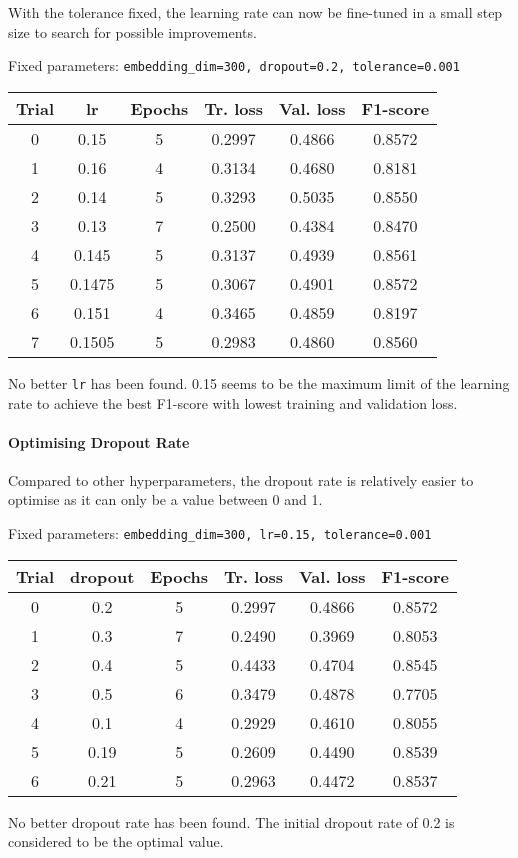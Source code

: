 \documentclass[11pt]{article}
\begin{document}
With the tolerance fixed, the learning rate can now be fine-tuned in a
small step size to search for possible improvements.

Fixed parameters:
\texttt{embedding\_dim=300,\ dropout=0.2,\ tolerance=0.001}

\begin{longtable}[]{@{}cccccc@{}}
\toprule
Trial & lr & Epochs & Tr. loss & Val. loss & F1-score\tabularnewline
\midrule
\endhead
0 & 0.15 & 5 & 0.2997 & 0.4866 & 0.8572\tabularnewline
1 & 0.16 & 4 & 0.3134 & 0.4680 & 0.8181\tabularnewline
2 & 0.14 & 5 & 0.3293 & 0.5035 & 0.8550\tabularnewline
3 & 0.13 & 7 & 0.2500 & 0.4384 & 0.8470\tabularnewline
4 & 0.145 & 5 & 0.3137 & 0.4939 & 0.8561\tabularnewline
5 & 0.1475 & 5 & 0.3067 & 0.4901 & 0.8572\tabularnewline
6 & 0.151 & 4 & 0.3465 & 0.4859 & 0.8197\tabularnewline
7 & 0.1505 & 5 & 0.2983 & 0.4860 & 0.8560\tabularnewline
\bottomrule
\end{longtable}

No better \texttt{lr} has been found. 0.15 seems to be the maximum limit
of the learning rate to achieve the best F1-score with lowest training
and validation loss.

\hypertarget{optimising-dropout-rate}{%
\paragraph{Optimising Dropout Rate}\label{optimising-dropout-rate}}

Compared to other hyperparameters, the dropout rate is relatively easier
to optimise as it can only be a value between 0 and 1.

Fixed parameters:
\texttt{embedding\_dim=300,\ lr=0.15,\ tolerance=0.001}

\begin{longtable}[]{@{}cccccc@{}}
\toprule
Trial & dropout & Epochs & Tr. loss & Val. loss &
F1-score\tabularnewline
\midrule
\endhead
0 & 0.2 & 5 & 0.2997 & 0.4866 & 0.8572\tabularnewline
1 & 0.3 & 7 & 0.2490 & 0.3969 & 0.8053\tabularnewline
2 & 0.4 & 5 & 0.4433 & 0.4704 & 0.8545\tabularnewline
3 & 0.5 & 6 & 0.3479 & 0.4878 & 0.7705\tabularnewline
4 & 0.1 & 4 & 0.2929 & 0.4610 & 0.8055\tabularnewline
5 & 0.19 & 5 & 0.2609 & 0.4490 & 0.8539\tabularnewline
6 & 0.21 & 5 & 0.2963 & 0.4472 & 0.8537\tabularnewline
\bottomrule
\end{longtable}

No better dropout rate has been found. The initial dropout rate of 0.2
is considered to be the optimal value.
\end{document}

